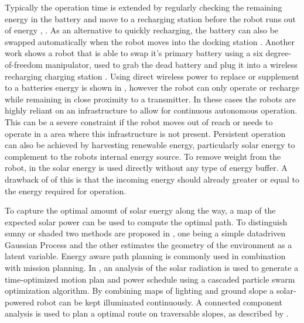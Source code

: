 \documentclass[letterpaper, 10 pt, conference]{ieeeconf}  %
\begin{document}

Typically the operation time is extended by regularly checking the remaining energy in the battery and move to a recharging station before the robot runs out of energy \cite{pickem_icra_2015}, \cite{rubenstein_icra_2012}.
As an alternative to quickly recharging, the battery can also be swapped automatically when the robot moves into the docking station \cite{kemal_mech_2015}.
Another work shows a robot that is able to swap it's primary battery using a six degree-of-freedom manipulator, used to grab the dead battery and plug it into a wireless recharging charging station \cite{zhang_conel_2013}.
Using direct wireless power to replace or supplement to a batteries energy is shown in \cite{karpelson_icra_2014}, however the robot can only operate or recharge while remaining in close proximity to a transmitter. 
In these cases the robots are highly reliant on an infrastructure to allow for continuous autonomous operation.
This can be a severe constraint if the robot moves out of reach or needs to operate in a area where this infrastructure is not present. Persistent operation can also be achieved by harvesting renewable energy, particularly solar energy to complement to the robots internal energy source. To remove weight from the robot, in \cite{bruhwiler_iros_2015} the solar energy is used directly without any type of energy buffer. A drawback of of this is that the incoming energy should already greater or equal to the energy required for operation. 


To capture the optimal amount of solar energy along the way, a map of the expected solar power can be used to compute the optimal path. To distinguish sunny or shaded two methods are proposed in \cite{plonski_tranro_2016}, one being a simple datadriven Gaussian Process and the other estimates the geometry of the environment as a latent variable.
Energy aware path planning is commonly used in combination with mission planning.
In \cite{kaplan_iros_2016}, an analysis of the solar radiation is used to generate a time-optimized motion plan and power schedule using a cascaded particle swarm optimization algorithm.
By combining maps of lighting and ground slope a solar-powered robot can be kept illuminated continuously. A connected component analysis is used to plan a optimal route on traversable slopes, as described by \cite{otten_icra_2015}.
\end{document}
